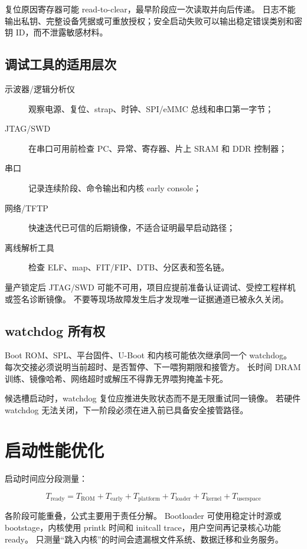复位原因寄存器可能 read-to-clear，最早阶段应一次读取并向后传递。
日志不能输出私钥、完整设备凭据或可重放授权；安全启动失败可以输出稳定错误类别和密钥 ID，而不泄露敏感材料。

\subsection{调试工具的适用层次}

\begin{description}
  \item[示波器/逻辑分析仪] 观察电源、复位、strap、时钟、SPI/eMMC 总线和串口第一字节；
  \item[JTAG/SWD] 在串口可用前检查 PC、异常、寄存器、片上 SRAM 和 DDR 控制器；
  \item[串口] 记录连续阶段、命令输出和内核 early console；
  \item[网络/TFTP] 快速迭代已可信的后期镜像，不适合证明最早启动路径；
  \item[离线解析工具] 检查 ELF、map、FIT/FIP、DTB、分区表和签名链。
\end{description}

量产锁定后 JTAG/SWD 可能不可用，项目应提前准备认证调试、受控工程样机或签名诊断镜像。
不要等现场故障发生后才发现唯一证据通道已被永久关闭。

\subsection{watchdog 所有权}

Boot ROM、SPL、平台固件、U-Boot 和内核可能依次继承同一个 watchdog。
每次交接必须说明当前超时、是否暂停、下一喂狗期限和接管方。
长时间 DRAM 训练、镜像哈希、网络超时或解压不得靠无界喂狗掩盖卡死。

候选槽启动时，watchdog 复位应推进失败状态而不是无限重试同一镜像。
若硬件 watchdog 无法关闭，下一阶段必须在进入前已具备安全接管路径。

\section{启动性能优化}

启动时间应分段测量：

\begin{equation}
  T_{\mathrm{ready}} =
  T_{\mathrm{ROM}} + T_{\mathrm{early}} + T_{\mathrm{platform}} +
  T_{\mathrm{loader}} + T_{\mathrm{kernel}} + T_{\mathrm{userspace}}
\end{equation}

各阶段可能重叠，公式主要用于责任分解。
Bootloader 可使用稳定计时源或 bootstage，内核使用 printk 时间和 initcall trace，用户空间再记录核心功能 ready。
只测量“跳入内核”的时间会遗漏根文件系统、数据迁移和业务服务。

